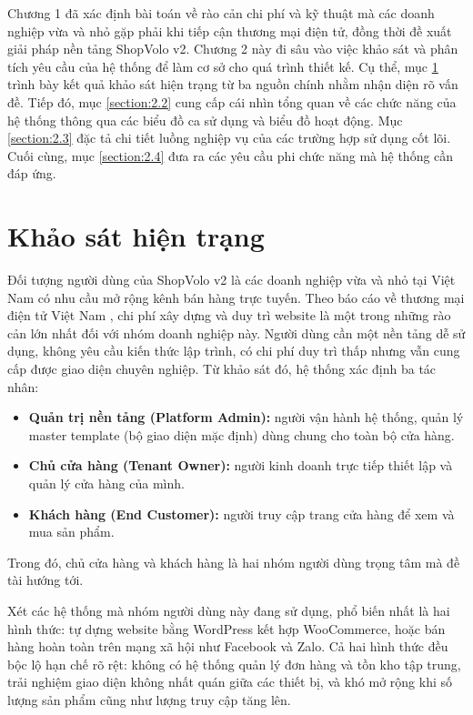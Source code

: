 \documentclass[../main.tex]{subfiles}
\begin{document}
Chương 1 đã xác định bài toán về rào cản chi phí và kỹ thuật mà các doanh nghiệp vừa và nhỏ gặp phải khi tiếp cận thương mại điện tử, đồng thời đề xuất giải pháp nền tảng ShopVolo v2. Chương 2 này đi sâu vào việc khảo sát và phân tích yêu cầu của hệ thống để làm cơ sở cho quá trình thiết kế. Cụ thể, mục \ref{section:2.1} trình bày kết quả khảo sát hiện trạng từ ba nguồn chính nhằm nhận diện rõ vấn đề. Tiếp đó, mục \ref{section:2.2} cung cấp cái nhìn tổng quan về các chức năng của hệ thống thông qua các biểu đồ ca sử dụng và biểu đồ hoạt động. Mục \ref{section:2.3} đặc tả chi tiết luồng nghiệp vụ của các trường hợp sử dụng cốt lõi. Cuối cùng, mục \ref{section:2.4} đưa ra các yêu cầu phi chức năng mà hệ thống cần đáp ứng.

\section{Khảo sát hiện trạng}
\label{section:2.1}

Đối tượng người dùng của ShopVolo v2 là các doanh nghiệp vừa và nhỏ tại Việt Nam có nhu cầu mở rộng kênh bán hàng trực tuyến. Theo báo cáo về thương mại điện tử Việt Nam \cite{vecom2024}, chi phí xây dựng và duy trì website là một trong những rào cản lớn nhất đối với nhóm doanh nghiệp này. Người dùng cần một nền tảng dễ sử dụng, không yêu cầu kiến thức lập trình, có chi phí duy trì thấp nhưng vẫn cung cấp được giao diện chuyên nghiệp. Từ khảo sát đó, hệ thống xác định ba tác nhân:

\begin{itemize}
    \item \textbf{Quản trị nền tảng (Platform Admin):} người vận hành hệ thống, quản lý master template (bộ giao diện mặc định) dùng chung cho toàn bộ cửa hàng.
    \item \textbf{Chủ cửa hàng (Tenant Owner):} người kinh doanh trực tiếp thiết lập và quản lý cửa hàng của mình.
    \item \textbf{Khách hàng (End Customer):} người truy cập trang cửa hàng để xem và mua sản phẩm.
\end{itemize}

Trong đó, chủ cửa hàng và khách hàng là hai nhóm người dùng trọng tâm mà đề tài hướng tới.

Xét các hệ thống mà nhóm người dùng này đang sử dụng, phổ biến nhất là hai hình thức: tự dựng website bằng WordPress kết hợp WooCommerce, hoặc bán hàng hoàn toàn trên mạng xã hội như Facebook và Zalo. Cả hai hình thức đều bộc lộ hạn chế rõ rệt: không có hệ thống quản lý đơn hàng và tồn kho tập trung, trải nghiệm giao diện không nhất quán giữa các thiết bị, và khó mở rộng khi số lượng sản phẩm cũng như lượng truy cập tăng lên.
\end{document}
